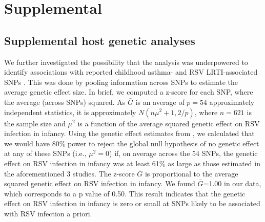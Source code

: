\documentclass{article} %
\newcommand{\beginsupplement}{%
        \setcounter{table}{0}
        \renewcommand{\thetable}{S\arabic{table}}%
        \setcounter{figure}{0}
        \renewcommand{\thefigure}{S\arabic{figure}}%
     }
\begin{document}




\beginsupplement
\section{Supplemental}
 \label{sec:Supplemental_text}

\subsection{Supplemental host genetic analyses}
We further investigated the possibility that the analysis was underpowered to identify associations with reported childhood asthma- and RSV LRTI-associated SNPs \citep{pividori2019shared, janssen2007genetic, pasanen2017genome}.
This was done by pooling information across SNPs to estimate the average genetic effect size. In brief, we computed a z-score for each SNP, where the average (across SNPs) squared. 
As $\bar{G}$  is an average of $p=54$ approximately independent statistics, it is approximately
$N(n\mu^2 + 1,2/p)$, where $n=621$  is the sample size and $\mu^2$ is a function of the average squared
genetic effect on RSV infection in infancy. Using the genetic effect estimates from 
\citet{pividori2019shared, janssen2007genetic, pasanen2017genome}
, we calculated that we would have 80\% power
to reject the global null hypothesis of no genetic effect at any of
these SNPs (i.e., $\mu^2 =0$) if, on average across the 54 SNPs, the genetic effect on RSV infection
in infancy was at least 61\% as large as those estimated in the aforementioned 3 studies. The 
z-score $\bar{G}$ is proportional to the average squared genetic effect on RSV infection in infancy. We
found $\bar{G}$=1.00  in our data, which corresponds to a p value of 0.50. This result indicates that the genetic effect on RSV infection in infancy is zero or small at SNPs likely to be associated with RSV infection a priori.
\end{document}
